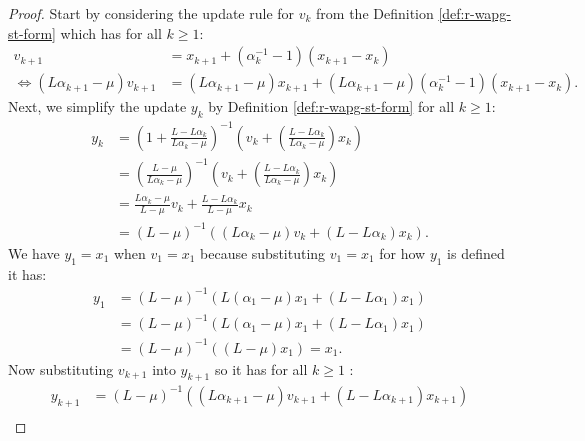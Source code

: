 \documentclass[12pt]{article}
\begin{document}
    \begin{proof}
        Start by considering the update rule for $v_k$ from the Definition \ref{def:r-wapg-st-form} which has for all $k \ge 1$: 
        \begin{align*}
            v_{k + 1} &= 
            x_{k + 1} + (\alpha_k^{-1} - 1)(x_{k + 1} - x_k)
            \\
            \iff 
            (L \alpha_{k + 1} - \mu)v_{k + 1} 
            &= 
            (L \alpha_{k + 1} - \mu)x_{k + 1} + (L\alpha_{k + 1} - \mu)(\alpha_k^{-1} - 1)(x_{k + 1} - x_k). 
        \end{align*}
        Next, we simplify the update $y_{k}$ by Definition \ref{def:r-wapg-st-form} for all $k \ge 1$: 
        \begin{align*}
            y_k &= 
            \left(
                1 + \frac{L - L\alpha_k}{L\alpha_k - \mu}
            \right)^{-1}
            \left(
                v_k + 
                \left(\frac{L - L\alpha_k}{L\alpha_k - \mu} \right) x_k
            \right)
            \\
            &= 
            \left(
            \frac{L - \mu}{L\alpha_k - \mu} 
            \right)^{-1}
            \left(
                v_k + 
                \left(\frac{L - L\alpha_k}{L\alpha_k - \mu} \right) x_k
            \right)
            \\
            &= 
            \frac{L\alpha_k - \mu}{L - \mu} v_k
            + 
            \frac{L - L \alpha_k}{L - \mu} x_k
            \\
            &= (L - \mu)^{-1}((L \alpha_k - \mu)v_k + (L - L \alpha_k)x_k). 
        \end{align*}
        We have $y_1 = x_1$ when $v_1 = x_1$ because substituting $v_1 = x_1$ for how $y_1$ is defined it has: 
        \begin{align*}
            y_1 &= (L - \mu)^{-1}(L(\alpha_1 - \mu)x_1 + (L - L\alpha_1)x_1)
            \\
            &= (L - \mu)^{-1}(L(\alpha_1 - \mu)x_1 + (L - L \alpha_1)x_1)
            \\
            &= (L - \mu)^{-1}((L - \mu)x_1) = x_1. 
        \end{align*}
        Now substituting $v_{k + 1}$ into $y_{k + 1}$ so it has for all $k\ge 1$ : 
        {\small
        \begin{align*}
            y_{k + 1} &= 
            (L - \mu)^{-1}((L\alpha_{k + 1} - \mu)v_{k + 1} + (L - L \alpha_{k + 1})x_{k + 1})
            \\

\end{align*}}
\end{proof}
\end{document}

